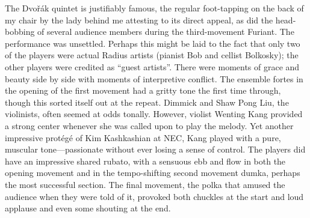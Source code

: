 The Dvořák quintet is justifiably famous, the regular foot-tapping on the back of my chair by the lady behind me attesting to its direct appeal, as did the head-bobbing of several audience members during the third-movement Furiant. The performance was unsettled. Perhaps this might be laid to the fact that only two of the players were actual Radius artists (pianist Bob and cellist Bolkosky); the other players were credited as “guest artists”. There were moments of grace and beauty side by side with moments of interpretive conflict. The ensemble fortes in the opening of the first movement had a gritty tone the first time through, though this sorted itself out at the repeat. Dimmick and Shaw Pong Liu, the violinists, often seemed at odds tonally. However, violist Wenting Kang provided a strong center whenever she was called upon to play the melody. Yet another impressive protégé of Kim Kashkashian at NEC, Kang played with a pure, muscular tone—passionate without ever losing a sense of control. The players did have an impressive shared rubato, with a sensuous ebb and flow in both the opening movement and in the tempo-shifting second movement dumka, perhaps the most successful section. The final movement, the polka that amused the audience when they were told of it, provoked both chuckles at the start and loud applause and even some shouting at the end.
